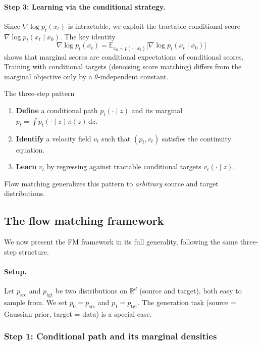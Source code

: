 \documentclass[11pt]{article}
\newcommand{\R}{\mathbb{R}}
\newcommand{\E}{\mathbb{E}}
\newcommand{\grad}{\nabla}
\newcommand{\dd}{\,\mathrm{d}}
\theoremstyle{definition}
\theoremstyle{remark}
\begin{document}
\paragraph{Step 3: Learning via the conditional strategy.}
Since $\grad\log p_t(x_t)$ is intractable, we exploit the tractable conditional score $\grad\log p_t(x_t\mid x_0)$.
The key identity
\[
\grad\log p_t(x_t) = \E_{x_0\sim p(\cdot\mid x_t)}\!\big[\grad\log p_t(x_t\mid x_0)\big]
\]
shows that marginal scores are conditional expectations of conditional scores.
Training with conditional targets (denoising score matching) differs from the marginal objective only by a $\theta$-independent constant.

\begin{keybox}{The three-step pattern}
\begin{enumerate}[nosep]
\item \textbf{Define} a conditional path $p_t(\cdot\mid z)$ and its marginal $p_t = \int p_t(\cdot\mid z)\pi(z)\dd z$.
\item \textbf{Identify} a velocity field $v_t$ such that $(p_t, v_t)$ satisfies the continuity equation.
\item \textbf{Learn} $v_t$ by regressing against tractable conditional targets $v_t(\cdot\mid z)$.
\end{enumerate}
Flow matching generalizes this pattern to \emph{arbitrary} source and target distributions.
\end{keybox}

\subsection{The flow matching framework}\label{subsec:fm-general}

We now present the FM framework in its full generality, following the same three-step structure.

\paragraph{Setup.}
Let $p_{\mathrm{src}}$ and $p_{\mathrm{tgt}}$ be two distributions on $\R^d$ (source and target), both easy to sample from.
We set $p_0 = p_{\mathrm{src}}$ and $p_1 = p_{\mathrm{tgt}}$.
The generation task (source = Gaussian prior, target = data) is a special case.

\subsubsection{Step 1: Conditional path and its marginal densities}
\end{document}
